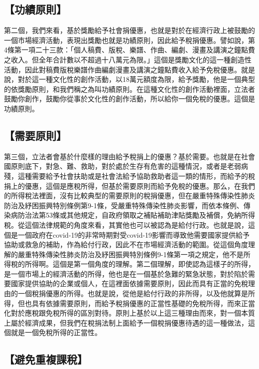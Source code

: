 \documentclass[]{ctexbook}
\begin{document}
\hypertarget{ux529fux7e3eux539fux5247}{%
\subsection{【功績原則】}\label{ux529fux7e3eux539fux5247}}

第二個，我們來看，基於獎勵給予社會捐優惠，也就是對於在經濟行政上被鼓勵的一個市場經濟活動，表現出獎勵也就是功績原則，因此給予稅捐優惠。譬如說，第4條第一項二十三款：「個人稿費、版稅、樂譜、作曲、編劇、漫畫及講演之鐘點費之收入。但全年合計數以不超過十八萬元為限。」這個是獎勵文化的這一種創造性活動，因此對稿費版稅樂譜作曲編劇漫畫及講演之鐘點費收入給予免稅優惠。就是說，對於這一種文化性的創作活動，以18萬元額度為限，給予獎勵，他是一個典型的依獎勵原則，和我們稱之為叫功績原則。在這種文化性的創作活動裡面，立法者鼓勵你創作，鼓勵你從事於文化性的創作活動，所以給你一個免稅的優惠。這個是功績原則。

\hypertarget{ux9700ux8981ux539fux5247}{%
\subsection{【需要原則】}\label{ux9700ux8981ux539fux5247}}

第三個，立法者會基於什麼樣的理由給予稅捐上的優惠？基於需要。也就是在社會國原則底下，對急、難、救助，對於處於生存有危害的這種情況，或者是老弱病殘，這種需要給予社會扶助或是社會法給予協助救助者這一類的情形，而給予的稅捐上的優惠，這個是應稅所得，但基於需要原則而給予免稅的優惠。那么，在我們的所得稅法裡面，沒有比較典型的需要原則的稅捐優惠，但在嚴重特殊傳染性肺炎防治及紓困振興特別條例第9-1條，受嚴重特殊傳染性肺炎影響，而依本條例、傳染病防治法第53條或其他規定，自政府領取之補貼補助津貼獎勵及補償，免納所得稅。從這個法律規範的角度來看，其實他也可以被認為是給付行政。也就是說，這個是一個政府在covid-19的非常時期對受covid-19影響而導致他需要國家提供給予協助或救急的補助，作為給付行政，因此不在市場經濟活動的範圍。從這個角度理解的嚴重特殊傳染性肺炎防治及紓困振興特別條例9-1條第一項之規定，他不是所得稅的所得啊。這個是第一個角度的理解。第二個理解，即使認為這樣子的所得，是一個市場上的經濟活動的所得，他也是在一個基於急難的緊急狀態，對於陷於需要國家提供協助的企業或個人，在這裡面依據需要原則，因此而具有正當的免稅理由的一個稅捐優惠的所得。也就是說，從他是給付行政的非所得，以及他就算是所得，但也具有依據需要原則，而給予稅捐優惠的正當性基礎的免稅所得，而來正當化對於應稅跟免稅所得的區別對待。原則上基於以上這三種理由而來，對一個本質上屬於經濟成果，但我們在稅捐法制上面給予一個稅捐優惠待遇的這一種做法，這個就是一個免稅所得的正當性。

\hypertarget{ux907fux514dux91cdux8907ux8ab2ux7a05}{%
\subsection{【避免重複課稅】}\label{ux907fux514dux91cdux8907ux8ab2ux7a05}}
\end{document}
